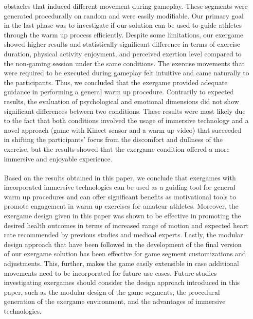 obstacles that induced different movement during gameplay. These segments were generated procedurally on random and were easily modifiable. Our primary goal in the last phase was to investigate if our solution can be used to guide athletes through the warm up process efficiently. Despite some limitations, our exergame showed higher results and statistically significant difference in terms of exercise duration, physical activity enjoyment, and perceived exertion level compared to the non-gaming session under the same conditions. The exercise movements that were required to be executed during gameplay felt intuitive and came naturally to the participants. Thus, we concluded that the exergame provided adequate guidance in performing a general warm up procedure. Contrarily to expected results, the evaluation of psychological and emotional dimensions  did not show significant differences between two conditions. These results were most likely due to the fact that both conditions involved the usage of immersive technology and a novel approach (game with Kinect sensor and a warm up video) that succeeded in shifting the participants' focus from the discomfort and dullness of the exercise, but the results showed that the exergame condition offered a more immersive and enjoyable experience.\\\\
Based on the results obtained in this paper, we conclude that exergames with incorporated immersive technologies can be used  as a guiding tool for general warm up procedures and can offer significant benefits as motivational tools to promote engagement in warm up exercises for amateur athletes. Moreover, the exergame design given in this paper was shown to be effective in promoting the desired health outcomes in terms of increased range of motion and expected heart rate recommended by previous studies and medical experts.  Lastly, the modular design approach that have been followed in the development of the final version of our exergame solution has been effective for game segment customizations and adjustments. This, further, makes the game easily extensible in case additional movements need to be incorporated for future use cases. Future studies investigating exergames should consider the design approach introduced in this paper, such as the modular design of the game segments, the procedural generation of the exergame environment, and the advantages of immersive technologies.\pagebreak

